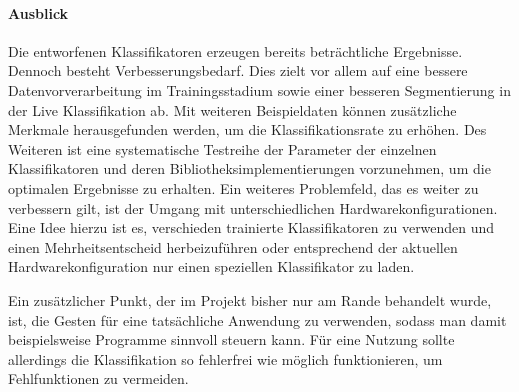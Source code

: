 \paragraph{Ausblick} 
Die entworfenen Klassifikatoren erzeugen bereits beträchtliche Ergebnisse.
Dennoch besteht Verbesserungsbedarf. Dies zielt vor allem auf eine bessere
Datenvorverarbeitung im Trainingsstadium sowie einer besseren Segmentierung in
der Live Klassifikation ab. Mit weiteren Beispieldaten können zusätzliche Merkmale
herausgefunden werden, um die Klassifikationsrate zu erhöhen. Des Weiteren ist
eine systematische Testreihe der Parameter der einzelnen Klassifikatoren und
deren Bibliotheksimplementierungen vorzunehmen, um die optimalen Ergebnisse zu
erhalten. Ein weiteres Problemfeld, das es weiter zu verbessern gilt, ist der
Umgang mit unterschiedlichen Hardwarekonfigurationen. Eine Idee hierzu ist es,
verschieden trainierte Klassifikatoren zu verwenden und einen Mehrheitsentscheid
herbeizuführen oder entsprechend der aktuellen Hardwarekonfiguration nur einen
speziellen Klassifikator zu laden. 

Ein zusätzlicher Punkt, der im Projekt bisher nur am Rande behandelt wurde, ist,
die Gesten für eine tatsächliche Anwendung zu verwenden, sodass man damit
beispielsweise Programme sinnvoll steuern kann. Für eine Nutzung sollte
allerdings die Klassifikation so fehlerfrei wie möglich funktionieren, um
Fehlfunktionen zu vermeiden.









